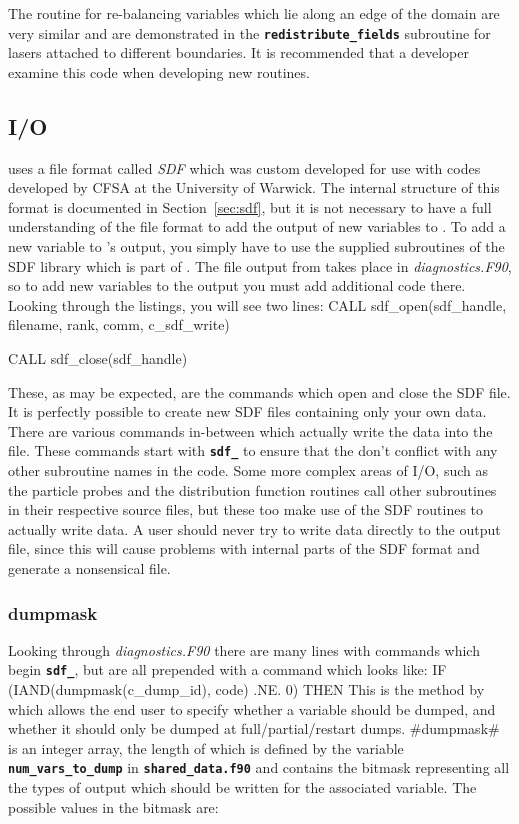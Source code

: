 \documentclass[12pt,a4paper]{article}
\newcommand{\inlinecode}[1]{{\color{warwickred} \bf\texttt{#1}}}
\newcommand{\sect}[1]{Section~\ref{sec:#1}}
\newcommand{\EPOCH}{{\color{warwickdark}\fontfamily{phv}\selectfont{EPOCH}}}
\newenvironment{boxverbatim}{\lboxverbatim{none}}{\endlboxverbatim}
\begin{document}
The routine for re-balancing variables which lie along an edge of the domain are
very similar and are demonstrated in the \inlinecode{redistribute\_fields}
subroutine for lasers attached to different boundaries. It is
recommended that a developer examine this code when developing new routines.

\subsection{{\EPOCH} I/O}
\label{sec:io}

{\EPOCH} uses a file format called {\it SDF} which was custom developed for use
with codes developed by CFSA at the University of Warwick. The internal
structure of this format is documented in \sect{sdf},
but it is not necessary to have a full understanding of the file format
to add the output of new variables to {\EPOCH}. To add a new variable to
{\EPOCH}'s output, you simply have to use the supplied subroutines of the SDF
library which is part of {\EPOCH}. The file output from {\EPOCH} takes place in
{\it diagnostics.F90}, so to add new variables to the output you must
add additional code there. Looking through the listings, you will see two lines:
\begin{boxverbatim}
  CALL sdf_open(sdf_handle, filename, rank, comm, c_sdf_write)

  CALL sdf_close(sdf_handle)
\end{boxverbatim}

These, as may be expected, are the commands which open and close the SDF file.
It is perfectly possible to create new SDF files containing only your own data.
There are various commands in-between which actually write the data into the
file. These commands start with \inlinecode{sdf\_} to ensure that the don't
conflict with any other subroutine names in the code.
Some more complex areas of I/O, such as the particle probes
and the distribution function routines call other subroutines in their
respective source files, but these too make use of the SDF routines to actually
write data. A user should never try to write data directly to the output file,
since this will cause problems with internal parts of the SDF format and
generate a nonsensical file.

\subsubsection{dumpmask}
Looking through {\it diagnostics.F90} there are many lines with commands which
begin \inlinecode{sdf\_}, but are all prepended with a command which looks
like:
\begin{boxverbatim}
  IF (IAND(dumpmask(c_dump_id), code) .NE. 0) THEN
\end{boxverbatim}
This is the method by which {\EPOCH} allows the end user to specify whether a
variable should be dumped, and whether it should only be dumped at
full/partial/restart dumps. #dumpmask# is an integer array, the length of
which is defined by the variable \inlinecode{num\_vars\_to\_dump} in
\inlinecode{shared\_data.f90} and contains the bitmask representing all the
types of output which should be written for the associated variable. The
possible values in the bitmask are:
\end{document}
